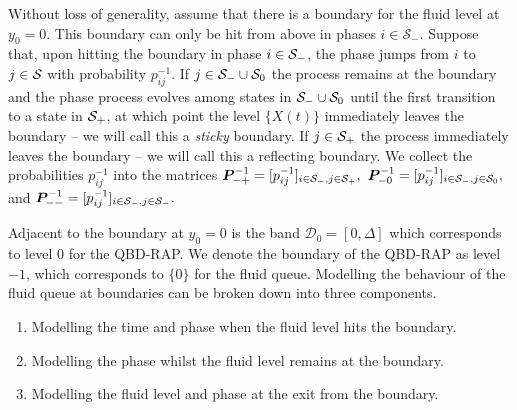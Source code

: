 Without loss of generality, assume that there is a boundary for the fluid level at \(y_0 = 0\). This boundary can only be hit from above in phases \(i\in\mathcal S_-\). %
Suppose that, upon hitting the boundary in phase \(i\in\mathcal{S}_-\), the phase jumps from \(i\) to \(j\in\mathcal{S}\) with probability \(p_{ij}^{-1}\). If \(j\in\mathcal{S}_-\cup\mathcal{S}_0\) the process remains at the boundary and the phase process evolves among states in \(\mathcal{S}_-\cup\mathcal{S}_0\) until the first transition to a state in \(\mathcal{S}_+\), at which point the level \(\{X(t)\}\) immediately leaves the boundary -- we will call this a \emph{sticky} boundary. If \(j\in\mathcal{S}_+\) the process immediately leaves the boundary -- we will call this a reflecting boundary. 
We collect the probabilities \(p_{ij}^{-1}\) into the matrices \(\boldsymbol P_{-+}^{-1} = [p_{ij}^{-1}]_{i\in\mathcal{S}_-,j\in\mathcal{S}_+},\) \(\boldsymbol P_{-0}^{-1} = [p_{ij}^{-1}]_{i\in\mathcal{S}_-,j\in\mathcal{S}_0},\) and \(\boldsymbol P_{--}^{-1} = [p_{ij}^{-1}]_{i\in\mathcal{S}_-,j\in\mathcal{S}_-}.\)

Adjacent to the boundary at \(y_0=0\) is the band \(\mathcal D_0=[0,\Delta]\) which corresponds to level \(0\) for the QBD-RAP. We denote the boundary of the QBD-RAP as level \(-1\), which corresponds to \(\{0\}\) for the fluid queue. Modelling the behaviour of the fluid queue at boundaries can be broken down into three components.
\begin{enumerate}
	\item Modelling the time and phase when the fluid level hits the boundary. 
	\item Modelling the phase whilst the fluid level remains at the boundary. 
	\item Modelling the fluid level and phase at the exit from the boundary. 
\end{enumerate}

